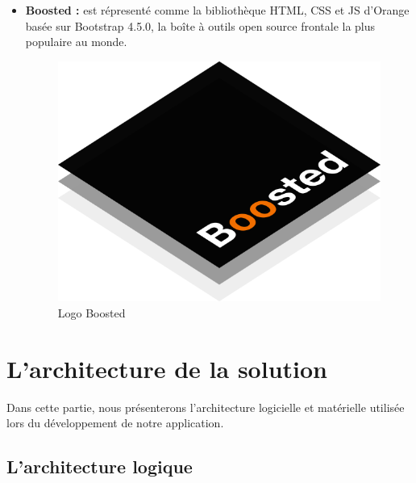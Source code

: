 \begin{itemize}
	
	\item \textbf{Boosted : } est répresenté comme la bibliothèque HTML, CSS et JS d'Orange basée sur Bootstrap 4.5.0, la boîte à outils open source frontale la plus populaire au monde.
	\begin{figure}[H]
		\centering
		\includegraphics[width=0.2\linewidth]{img/logos/boosted}
		\caption[Logo Boosted]{Logo Boosted}
		\label{fig:boosted}
	\end{figure}
\end{itemize}

\section[L'architecture de la solution]{L'architecture de la solution}
Dans cette partie, nous présenterons l'architecture logicielle et matérielle utilisée lors du développement de notre application.
\subsection[L'architecture logique]{L'architecture logique}
